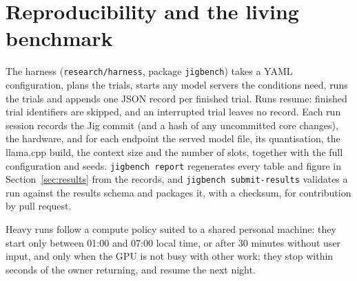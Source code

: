 \section{Reproducibility and the living benchmark}
\label{sec:repro}

The harness (\texttt{research/harness}, package \texttt{jigbench}) takes a YAML configuration, plans the
trials, starts any model servers the conditions need, runs the trials and appends one JSON record per
finished trial. Runs resume: finished trial identifiers are skipped, and an interrupted trial leaves no
record. Each run session records the Jig commit (and a hash of any uncommitted core changes), the
hardware, and for each endpoint the served model file, its quantisation, the llama.cpp build, the
context size and the number of slots, together with the full configuration and seeds.
\texttt{jigbench report} regenerates every table and figure in Section~\ref{sec:results} from the
records, and \texttt{jigbench submit-results} validates a run against the results schema and packages
it, with a checksum, for contribution by pull request.

Heavy runs follow a compute policy suited to a shared personal machine: they start only between 01:00
and 07:00 local time, or after 30 minutes without user input, and only when the GPU is not busy with
other work; they stop within seconds of the owner returning, and resume the next night.
